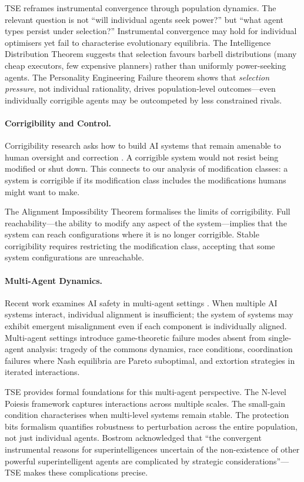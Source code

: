 \documentclass[12pt]{article}
\begin{document}
TSE reframes instrumental convergence through population dynamics. The relevant question is not ``will individual agents seek power?'' but ``what agent types persist under selection?'' Instrumental convergence may hold for individual optimisers yet fail to characterise evolutionary equilibria. The Intelligence Distribution Theorem suggests that selection favours barbell distributions (many cheap executors, few expensive planners) rather than uniformly power-seeking agents. The Personality Engineering Failure theorem shows that \emph{selection pressure}, not individual rationality, drives population-level outcomes---even individually corrigible agents may be outcompeted by less constrained rivals.

\paragraph{Corrigibility and Control.}
Corrigibility research asks how to build AI systems that remain amenable to human oversight and correction \citep{soares2015}. A corrigible system would not resist being modified or shut down. This connects to our analysis of modification classes: a system is corrigible if its modification class includes the modifications humans might want to make.

The Alignment Impossibility Theorem formalises the limits of corrigibility. Full reachability---the ability to modify any aspect of the system---implies that the system can reach configurations where it is no longer corrigible. Stable corrigibility requires restricting the modification class, accepting that some system configurations are unreachable.

\paragraph{Multi-Agent Dynamics.}
Recent work examines AI safety in multi-agent settings \citep{dafoe2020, critch2020}. When multiple AI systems interact, individual alignment is insufficient; the system of systems may exhibit emergent misalignment even if each component is individually aligned. Multi-agent settings introduce game-theoretic failure modes absent from single-agent analysis: tragedy of the commons dynamics, race conditions, coordination failures where Nash equilibria are Pareto suboptimal, and extortion strategies in iterated interactions.

TSE provides formal foundations for this multi-agent perspective. The N-level Poiesis framework captures interactions across multiple scales. The small-gain condition characterises when multi-level systems remain stable. The protection bits formalism quantifies robustness to perturbation across the entire population, not just individual agents. Bostrom acknowledged that ``the convergent instrumental reasons for superintelligences uncertain of the non-existence of other powerful superintelligent agents are complicated by strategic considerations''---TSE makes these complications precise.
\end{document}
